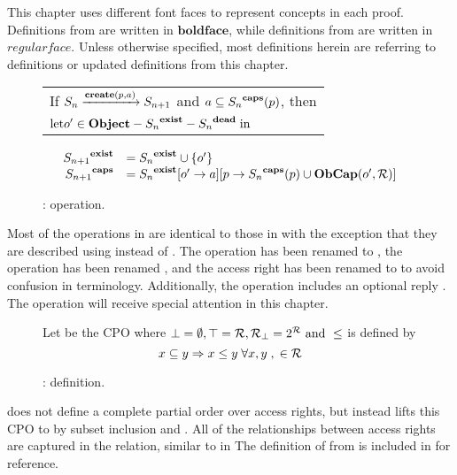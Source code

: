 This chapter uses different font faces to represent concepts in each proof.
Definitions from \TMSW{} are written in \ensuremath{\mathbf{bold face}}, while definitions from \TMmodelName{} are written in \ensuremath{regular face}.
Unless otherwise specified, most definitions herein are referring to \TMSW{} definitions or updated definitions from this chapter.

\begin{figure}
  \begin{tabular}{l}
    If \( \singleop{S_n}{S_{n+1}}{\createapp{p}{a}} \) and \( a \subseteq \capsetapp{S_n}{p} \), then \\
    \( \textnormal{let} o' \in \objectset - \existset{S_n} - \deadset{S_n} \; \textnormal{in} \)
  \end{tabular}
  \[
  \begin{array}{rl}
    \existset{S_{n+1}} & = \existset{S_n} \cup \{o'\} \\
    \capset{S_{n+1}} & = \existset{S_n}[o' \rightarrow a][p \rightarrow \capsetapp{S_n}{p} \cup \obcapapp{o'}{\rightsset}] 
  \end{array}
  \]
  \caption{\modellbl{} : \create{} operation. \label{def:SW:create}}
\end{figure}

Most of the operations in \TMmodelName{} are identical to those in \TMSW{} with the exception that they are described using \TMidxs{} instead of \TMcaps{}.
The \create{} operation has been renamed to \COQallocate{}, the \invoke{} operation has been renamed \COQsend{}, and the \execright{} access right has been renamed to \COQtx{} to avoid confusion in terminology.
Additionally, the \COQsend{} operation includes an optional reply \TMcap{}.
The \TMSW{} \create{} operation will receive special attention in this chapter.

\begin{figure}
Let \rightscpo be the CPO where \( \rightsbot = \norights, \rightstop = \rightsset, \rightscpo = 2^{\rightsset} \text{ and } \rightsleq\) is defined by 
\[ x \subseteq y \Rightarrow x \rightsleq y \; \forallspaced{x,y}{\in \rightsset} \]
\caption{\modellbl{} : \rightscpo definition.\label{def:SW:rights-cpo}}
\end{figure}

\TMmodelName{} does not define a complete partial order over access rights, but instead lifts this CPO to \TMaccessGraphs{} by subset inclusion and \COQtransfer{}.
All of the relationships between access rights are captured in the \COQtransfer{} relation, similar to \transaccess{} in \TMSW{}
The definition of \rightscpo{} from \TMSW{} is included in  for reference.

